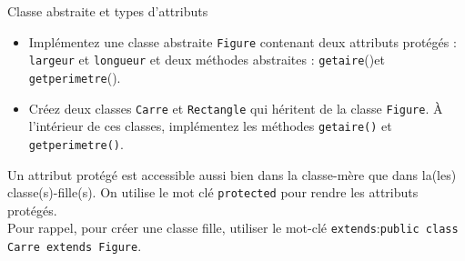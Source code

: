 \begin{Exercice}[10 minutes]{Classe abstraite et types d'attributs}
\begin{itemize}
    \item Implémentez une classe abstraite \lstinline{Figure} contenant deux attributs protégés : \lstinline{largeur} et \lstinline{longueur} et deux méthodes abstraites : \lstinline{getaire}()et \lstinline{getperimetre}().
    \item Créez deux classes \lstinline{Carre} et \lstinline{Rectangle} qui héritent de la classe \lstinline{Figure}. À l'intérieur de ces classes, implémentez les méthodes \lstinline{getaire()} et \lstinline{getperimetre()}.
\end{itemize}

\begin{conseil}
    Un attribut protégé est accessible aussi bien dans la classe-mère que dans la(les) classe(s)-fille(s). On utilise le mot clé \lstinline{protected} pour rendre les attributs protégés. \\
    Pour rappel, pour créer une classe fille, utiliser le mot-clé \lstinline{extends}:\lstinline{public class Carre extends Figure}.
\end{conseil}


\begin{solution}
 
\end{solution}
\end{Exercice}

\newpage
